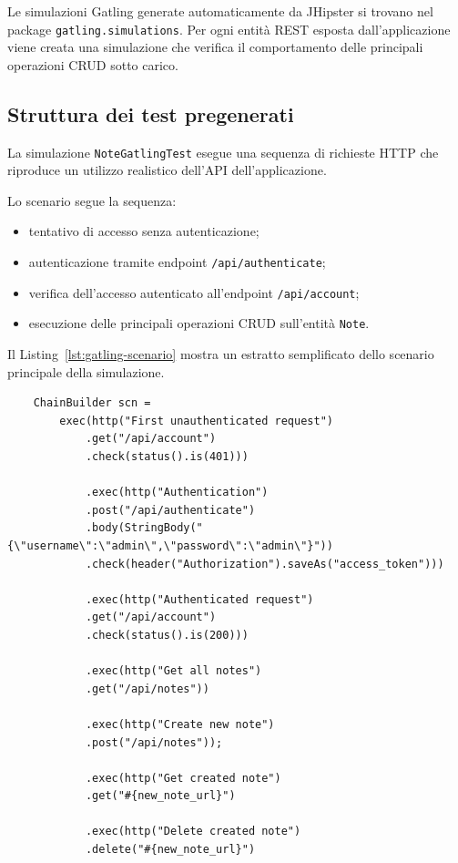 Le simulazioni Gatling generate automaticamente da JHipster si trovano nel package \texttt{gatling.simulations}. Per ogni entità REST esposta dall'applicazione viene creata una simulazione che verifica il comportamento delle principali operazioni CRUD sotto carico.

\subsection{Struttura dei test pregenerati}
La simulazione \texttt{NoteGatlingTest} esegue una sequenza di richieste HTTP che riproduce un utilizzo realistico dell'API dell'applicazione.

Lo scenario segue la sequenza:

\begin{itemize}
	\item tentativo di accesso senza autenticazione;
	\item autenticazione tramite endpoint \texttt{/api/authenticate};
	\item verifica dell'accesso autenticato all'endpoint \texttt{/api/account};
	\item esecuzione delle principali operazioni CRUD sull'entità \texttt{Note}.
\end{itemize}

Il Listing~\ref{lst:gatling-scenario} mostra un estratto semplificato dello scenario principale della simulazione.

\captionsetup{type=listing}
\label{lst:gatling-scenario}
\begin{verbatim}
	ChainBuilder scn =
		exec(http("First unauthenticated request")
			.get("/api/account")
			.check(status().is(401)))
			
			.exec(http("Authentication")
			.post("/api/authenticate")
			.body(StringBody("{\"username\":\"admin\",\"password\":\"admin\"}"))
			.check(header("Authorization").saveAs("access_token")))
			
			.exec(http("Authenticated request")
			.get("/api/account")
			.check(status().is(200)))
			
			.exec(http("Get all notes")
			.get("/api/notes"))
			
			.exec(http("Create new note")
			.post("/api/notes"));
			
			.exec(http("Get created note")
			.get("#{new_note_url}")
			
			.exec(http("Delete created note")
			.delete("#{new_note_url}")
\end{verbatim}

